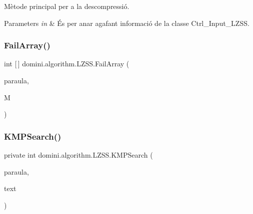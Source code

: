 Mètode principal per a la descompressió. 


\begin{DoxyParams}{Parameters}
{\em in} & És per anar agafant informació de la classe Ctrl\+\_\+\+Input\+\_\+\+L\+Z\+SS. \\
\hline
\end{DoxyParams}
\mbox{\label{classdomini_1_1algorithm_1_1LZSS_a56733a42f84d7a58cc5db9ea5f67835f}} 
\subsubsection{\texorpdfstring{Fail\+Array()}{FailArray()}}
{\footnotesize\ttfamily int \mbox{[}$\,$\mbox{]} domini.\+algorithm.\+L\+Z\+S\+S.\+Fail\+Array (\begin{DoxyParamCaption}\item[{Array\+List$<$ Byte $>$}]{paraula,  }\item[{int}]{M }\end{DoxyParamCaption})\hspace{0.3cm}{\ttfamily [inline]}}

\mbox{\label{classdomini_1_1algorithm_1_1LZSS_a88e88f2bb6e984cadf48e1c71f0234fc}} 
\subsubsection{\texorpdfstring{K\+M\+P\+Search()}{KMPSearch()}}
{\footnotesize\ttfamily private int domini.\+algorithm.\+L\+Z\+S\+S.\+K\+M\+P\+Search (\begin{DoxyParamCaption}\item[{Array\+List$<$ Byte $>$}]{paraula,  }\item[{\hyperlink{classdomini_1_1utils_1_1ArrayCircular}{Array\+Circular}}]{text }\end{DoxyParamCaption})\hspace{0.3cm}{\ttfamily [inline]}}



